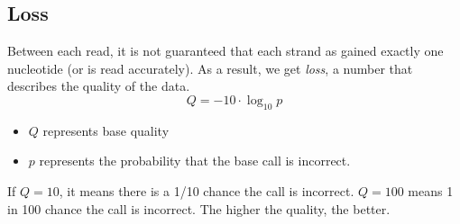 \documentclass[10pt]{article}
\begin{document}
\subsection*{Loss}
Between each read, it is not guaranteed that each strand as gained exactly one nucleotide (or is read accurately).  As a result, we get \textit{loss}, a number that describes the quality of the data.
\[Q = -10 \cdot \log_{10} p\]
\begin{itemize}
    \item $Q$ represents base quality
    \item $p$ represents the probability that the base call is incorrect.
\end{itemize}
If $Q = 10$, it means there is a 1/10 chance the call is incorrect.  $Q=100$ means 1 in 100 chance the call is incorrect.  The higher the quality, the better.
\end{document}

